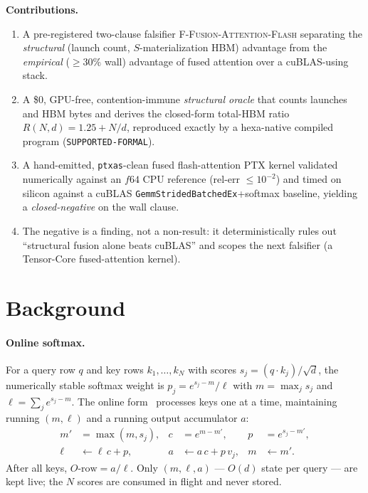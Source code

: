 \documentclass[11pt,a4paper]{article}
\newcommand{\verdict}[1]{\texttt{#1}}
\newcommand{\falsifier}{\textsc{F-Fusion-Attention-Flash}}
\begin{document}
\medskip
\noindent\textbf{Contributions.}
\begin{enumerate}\itemsep0.3em
\item A pre-registered two-clause falsifier \falsifier{} separating the
  \emph{structural} (launch count, $S$-materialization HBM) advantage from the
  \emph{empirical} ($\geq 30\%$ wall) advantage of fused attention over a
  cuBLAS-using stack.
\item A \$0, GPU-free, contention-immune \emph{structural oracle} that counts
  launches and HBM bytes and derives the closed-form total-HBM ratio
  $R(N,d)=1.25+N/d$, reproduced exactly by a hexa-native compiled program
  (\verdict{\textcolor{blue!60!black}{SUPPORTED-FORMAL}}).
\item A hand-emitted, \verdict{ptxas}-clean fused flash-attention PTX kernel
  validated numerically against an $f64$ CPU reference (rel-err $\leq 10^{-2}$)
  and timed on silicon against a cuBLAS \verdict{GemmStridedBatchedEx}+softmax
  baseline, yielding a \emph{closed-negative} on the wall clause.
\item The negative is a finding, not a non-result: it deterministically rules
  out ``structural fusion alone beats cuBLAS'' and scopes the next falsifier (a
  Tensor-Core fused-attention kernel).
\end{enumerate}

\section{Background}
\label{sec:bg}

\paragraph{Online softmax.}
For a query row $q$ and key rows $k_1,\dots,k_N$ with scores
$s_j = (q\cdot k_j)/\sqrt{d}$, the numerically stable softmax weight is
$p_j = e^{s_j-m}/\ell$ with $m=\max_j s_j$ and $\ell=\sum_j e^{s_j-m}$. The
online form~\citep{milakov2018online} processes keys one at a time, maintaining
running $(m,\ell)$ and a running output accumulator $a$:
\begin{align}
  m' &= \max(m, s_j), &
  c &= e^{m-m'}, &
  p &= e^{s_j-m'},\\
  \ell &\leftarrow \ell\,c + p, &
  a &\leftarrow a\,c + p\,v_j, &
  m &\leftarrow m'.
\end{align}
After all keys, $O\text{-row} = a/\ell$. Only $(m,\ell,a)$ --- $O(d)$ state per
query --- are kept live; the $N$ scores are consumed in flight and never stored.
\end{document}
